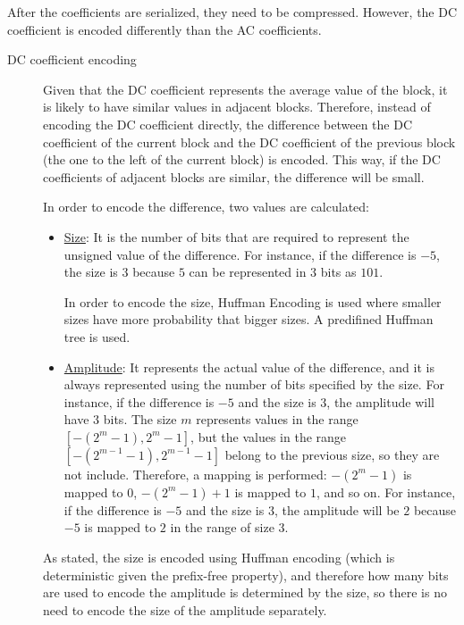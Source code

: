 After the coefficients are serialized, they need to be compressed. However, the DC coefficient is encoded differently than the AC coefficients.
\begin{description}
    \item[DC coefficient encoding]
    
    Given that the DC coefficient represents the average value of the block, it is likely to have similar values in adjacent blocks. Therefore, instead of encoding the DC coefficient directly, the difference between the DC coefficient of the current block and the DC coefficient of the previous block (the one to the left of the current block) is encoded. This way, if the DC coefficients of adjacent blocks are similar, the difference will be small.

    In order to encode the difference, two values are calculated:
    \begin{itemize}
        \item \ul{Size}: It is the number of bits that are required to represent the unsigned value of the difference. For instance, if the difference is $-5$, the size is $3$ because $5$ can be represented in $3$ bits as $101$.
        
        In order to encode the size, Huffman Encoding is used where smaller sizes have more probability that bigger sizes. A predifined Huffman tree is used.
        
        \item \ul{Amplitude}: It represents the actual value of the difference, and it is always represented using the number of bits specified by the size. For instance, if the difference is $-5$ and the size is $3$, the amplitude will have $3$ bits. The size $m$ represents values in the range $[-(2^{m}-1), 2^{m}-1]$, but the values in the range $[-(2^{m-1}-1), 2^{m-1}-1]$ belong to the previous size, so they are not include. Therefore, a mapping is performed: $-(2^{m}-1)$ is mapped to $0$, $-(2^{m}-1)+1$ is mapped to $1$, and so on. For instance, if the difference is $-5$ and the size is $3$, the amplitude will be $2$ because $-5$ is mapped to $2$ in the range of size $3$.
    \end{itemize}

    As stated, the size is encoded using Huffman encoding (which is deterministic given the prefix-free property), and therefore how many bits are used to encode the amplitude is determined by the size, so there is no need to encode the size of the amplitude separately.


\end{description}
